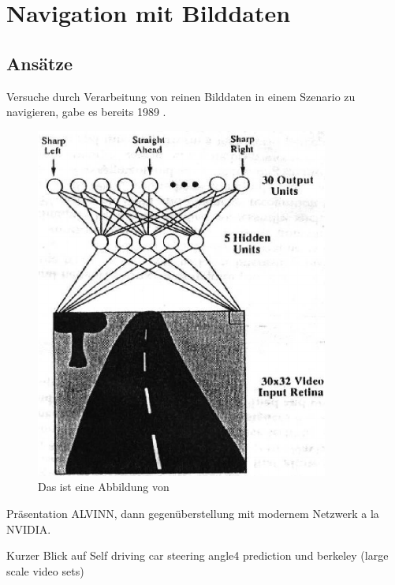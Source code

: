 %
\chapter{Navigation mit Bilddaten}

\section{Ansätze}

Versuche durch Verarbeitung von reinen Bilddaten in einem Szenario zu navigieren, gabe es bereits 1989 \cite{pomerleau1989alvinn}.


\begin{figure}
	\centering
	\includegraphics[scale=0.7]{figures/Architecture-ALVINN.png}
	\caption{Das ist eine Abbildung von \cite{Architecture-ALVINN}}
	\label{img:ALVINN}
\end{figure}

 Präsentation ALVINN, dann gegenüberstellung mit modernem Netzwerk a la NVIDIA.

Kurzer Blick auf  Self driving car steering angle4 prediction und berkeley (large scale video sets)




